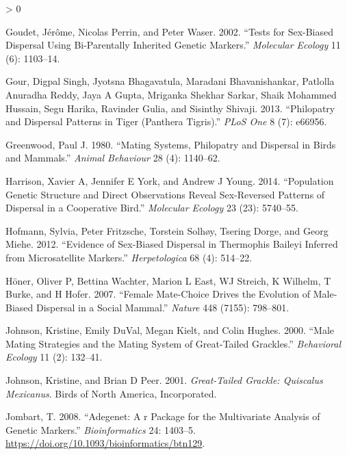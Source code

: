 \documentclass[
]{article}
\newlength{\cslhangindent}
\newenvironment{CSLReferences}[2] %
 {%
  \setlength{\parindent}{0pt}
  \ifodd #1 \everypar{\setlength{\hangindent}{\cslhangindent}}\ignorespaces\fi
  \ifnum #2 > 0
  \setlength{\parskip}{#2\baselineskip}
  \fi
 }%
 {}
\begin{document}
\begin{CSLReferences}{1}{0}
\leavevmode\hypertarget{ref-goudet2002tests}{}%
Goudet, Jérôme, Nicolas Perrin, and Peter Waser. 2002. {``Tests for
Sex-Biased Dispersal Using Bi-Parentally Inherited Genetic Markers.''}
\emph{Molecular Ecology} 11 (6): 1103--14.

\leavevmode\hypertarget{ref-gour2013philopatry}{}%
Gour, Digpal Singh, Jyotsna Bhagavatula, Maradani Bhavanishankar,
Patlolla Anuradha Reddy, Jaya A Gupta, Mriganka Shekhar Sarkar, Shaik
Mohammed Hussain, Segu Harika, Ravinder Gulia, and Sisinthy Shivaji.
2013. {``Philopatry and Dispersal Patterns in Tiger (Panthera
Tigris).''} \emph{PLoS One} 8 (7): e66956.

\leavevmode\hypertarget{ref-greenwood1980mating}{}%
Greenwood, Paul J. 1980. {``Mating Systems, Philopatry and Dispersal in
Birds and Mammals.''} \emph{Animal Behaviour} 28 (4): 1140--62.

\leavevmode\hypertarget{ref-harrison2014population}{}%
Harrison, Xavier A, Jennifer E York, and Andrew J Young. 2014.
{``Population Genetic Structure and Direct Observations Reveal
Sex-Reversed Patterns of Dispersal in a Cooperative Bird.''}
\emph{Molecular Ecology} 23 (23): 5740--55.

\leavevmode\hypertarget{ref-hofmann2012evidence}{}%
Hofmann, Sylvia, Peter Fritzsche, Torstein Solhøy, Tsering Dorge, and
Georg Miehe. 2012. {``Evidence of Sex-Biased Dispersal in Thermophis
Baileyi Inferred from Microsatellite Markers.''} \emph{Herpetologica} 68
(4): 514--22.

\leavevmode\hypertarget{ref-honer2007female}{}%
Höner, Oliver P, Bettina Wachter, Marion L East, WJ Streich, K Wilhelm,
T Burke, and H Hofer. 2007. {``Female Mate-Choice Drives the Evolution
of Male-Biased Dispersal in a Social Mammal.''} \emph{Nature} 448
(7155): 798--801.

\leavevmode\hypertarget{ref-johnson2000male}{}%
Johnson, Kristine, Emily DuVal, Megan Kielt, and Colin Hughes. 2000.
{``Male Mating Strategies and the Mating System of Great-Tailed
Grackles.''} \emph{Behavioral Ecology} 11 (2): 132--41.

\leavevmode\hypertarget{ref-johnson2001great}{}%
Johnson, Kristine, and Brian D Peer. 2001. \emph{Great-Tailed Grackle:
Quiscalus Mexicanus}. Birds of North America, Incorporated.

\leavevmode\hypertarget{ref-Jombart2008adegenet}{}%
Jombart, T. 2008. {``Adegenet: A r Package for the Multivariate Analysis
of Genetic Markers.''} \emph{Bioinformatics} 24: 1403--5.
\url{https://doi.org/10.1093/bioinformatics/btn129}.


\end{CSLReferences}
\end{document}

